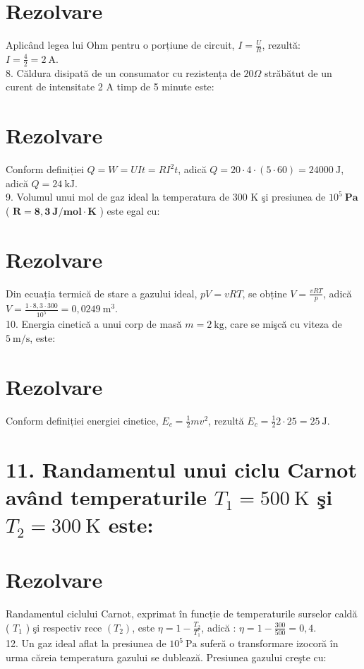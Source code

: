 \section*{Rezolvare}
Aplicând legea lui Ohm pentru o porțiune de circuit, $I=\frac{U}{R}$, rezultă:\\
$I=\frac{4}{2}=2 \mathrm{~A}$.\\
8. Căldura disipată de un consumator cu rezistența de $20 \Omega$ străbătut de un curent de intensitate 2 A timp de 5 minute este:

\section*{Rezolvare}
Conform definiției $Q=W=U I t=R I^{2} t$, adică $Q=20 \cdot 4 \cdot(5 \cdot 60)=24000 \mathrm{~J}$, adică $Q=24 \mathrm{~kJ}$.\\
9. Volumul unui mol de gaz ideal la temperatura de 300 K şi presiunea de $10^{5} \mathbf{~ P a}$ ( $\mathbf{R} \boldsymbol{=} \mathbf{8 , 3} \mathbf{~ J} / \mathbf{m o l} \cdot \mathbf{K}$ ) este egal cu:

\section*{Rezolvare}
Din ecuația termică de stare a gazului ideal, $p V=v R T$, se obține $V=\frac{v R T}{p}$, adică $V=\frac{1 \cdot 8,3 \cdot 300}{10^{5}}=0,0249 \mathrm{~m}^{3}$.\\
10. Energia cinetică a unui corp de masă $m=2 \mathrm{~kg}$, care se mişcă cu viteza de $5 \mathrm{~m} / \mathrm{s}$, este:

\section*{Rezolvare}
Conform definiției energiei cinetice, $E_{c}=\frac{1}{2} m v^{2}$, rezultă $E_{c}=\frac{1}{2} 2 \cdot 25=25 \mathrm{~J}$.

\section*{11. Randamentul unui ciclu Carnot având temperaturile $T_{1}=500 \mathrm{~K}$ şi $T_{2}=300 \mathrm{~K}$ este:}
\section*{Rezolvare}
Randamentul ciclului Carnot, exprimat în funcție de temperaturile surselor caldă ( $T_{1}$ ) şi respectiv rece $\left(T_{2}\right)$, este $\eta=1-\frac{T_{2}}{T_{1}}$, adică : $\eta=1-\frac{300}{500}=0,4$.\\
12. Un gaz ideal aflat la presiunea de $10^{5} \mathrm{~Pa}$ suferă o transformare izocoră în urma căreia temperatura gazului se dublează. Presiunea gazului creşte cu:

